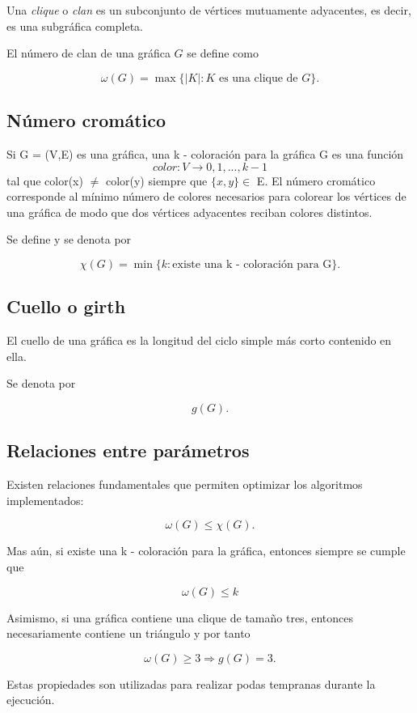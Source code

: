 \documentclass[12pt]{article}
\begin{document}
Una \emph{clique} o \emph{clan} es un subconjunto de vértices mutuamente adyacentes, es decir, es una subgráfica completa.

El número de clan de una gráfica $G$ se define como

\[
\omega(G)=
\max\{|K|:K \text{ es una clique de } G\}.
\]

\subsection{Número cromático}

Si G = (V,E) es una gráfica, una k - coloración para la gráfica G es una función
\[
color : V \to {0,1,...,k-1}
\]
tal que color(x) $\neq$ color(y) siempre que $\{x,y\} \in$ E. El número cromático corresponde al mínimo número de colores necesarios para colorear
los vértices de una gráfica de modo que dos vértices adyacentes reciban colores
distintos.

Se define y se denota por

\[
\chi(G) = \min\{k : \text{existe una k - coloración para G}\}.
\]

\subsection{Cuello o girth}

El cuello de una gráfica es la longitud del ciclo simple más corto contenido en ella.

Se denota por

\[
g(G).
\]

\subsection{Relaciones entre parámetros}

Existen relaciones fundamentales que permiten optimizar los algoritmos implementados:

\[
\omega(G)\leq \chi(G).
\]

Mas aún, si existe una k - coloración para la gráfica, entonces siempre se cumple que

\[
\omega(G)\leq k
\]

Asimismo, si una gráfica contiene una clique de tamaño tres, entonces necesariamente
contiene un triángulo y por tanto

\[
\omega(G)\geq 3
\Longrightarrow
g(G)=3.
\]

Estas propiedades son utilizadas para realizar podas tempranas durante la ejecución.
\end{document}
